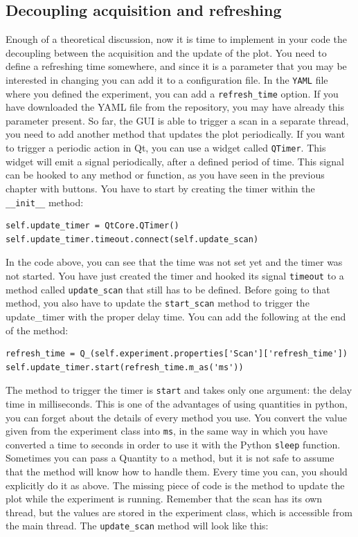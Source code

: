 \subsection{Decoupling acquisition and refreshing}\label{decoupling-acquisition-andrefreshing}
Enough of a theoretical discussion, now it is time to implement in your
code the decoupling between the acquisition and the update of the plot.
You need to define a refreshing time somewhere, and since it is a parameter
that you may be interested in changing you can add it to a configuration
file. In the \texttt{YAML} file where you defined the experiment, you
can add a \texttt{refresh_time} option. If you have downloaded the
{YAML} file from the repository, you may have already this parameter
present. So far, the {GUI} is able to trigger a scan in a separate
thread, you need to add another method that updates the plot
periodically. If you want to trigger a periodic action in Qt, you can
use a widget called \texttt{QTimer}. This widget will emit a signal
periodically, after a defined period of time. This signal can be hooked
to any method or function, as you have seen in the previous chapter with
buttons. You have to start by creating the timer within the
\texttt{__init__} method:

\begin{verbatim}
self.update_timer = QtCore.QTimer()
self.update_timer.timeout.connect(self.update_scan)
\end{verbatim}

In the code above, you can see that the time was not set yet and the timer was not started. You have just created the timer and hooked its
signal \texttt{timeout} to a method called \texttt{update_scan} that
still has to be defined. Before going to that method, you also have to
update the \texttt{start_scan} method to trigger the update\_timer with
the proper delay time. You can add the following at the end of
the method:

\begin{verbatim}
refresh_time = Q_(self.experiment.properties['Scan']['refresh_time'])
self.update_timer.start(refresh_time.m_as('ms'))
\end{verbatim}

The method to trigger the timer is \texttt{start} and takes only one
argument: the delay time in milliseconds. This is one of the advantages
of using quantities in python, you can forget about the details of every
method you use. You convert the value given from the experiment class
into \texttt{ms}, in the same way in which you have converted a time to
seconds in order to use it with the Python \texttt{sleep} function.
Sometimes you can pass a Quantity to a method, but it is not safe to
assume that the method will know how to handle them. Every time you can,
you should explicitly do it as above. The missing piece of code is the
method to update the plot while the experiment is running. Remember that
the scan has its own thread, but the values are stored in the
experiment class, which is accessible from the main thread. The
\texttt{update_scan} method will look like this:

